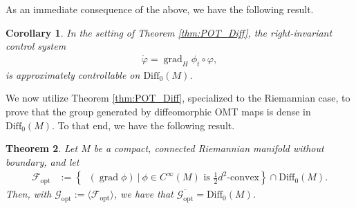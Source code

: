 \documentclass{article}
\newtheorem{theorem}{Theorem}
\newtheorem{corollary}[theorem]{Corollary}
\theoremstyle{remark}
\newcommand{\M}{M}
\newcommand{\Cinf}{C^{\infty}(\M)}
\newcommand{\cconv}{$\tfrac{1}{2}d^2$-convex}
\newcommand{\Diff}{\mathrm{Diff}_0(\M)}
\DeclareMathOperator{\grad}{\mathrm{grad}}
\DeclareMathOperator{\expg}{\mathrm{exp}^{\text{$g$}}}
\newcommand{\GOPT}{\mathcal{G}_{\mathrm{opt}}}
\newcommand{\FOPT}{\mathcal{F}_{\mathrm{opt}}}
\begin{document}
%
As an immediate consequence of the above, we have the following result.
%
\begin{corollary}
    In the setting of Theorem \ref{thm:POT_Diff}, the right-invariant control system 
    \begin{align*}
        \dot{\varphi} = \grad_H\phi_t\circ\varphi,
    \end{align*}
    is approximately controllable on $\Diff$.
\end{corollary}
%

We now utilize Theorem \ref{thm:POT_Diff}, specialized to the Riemannian case, to prove that the group generated by diffeomorphic OMT maps is dense in $\Diff$. To that end, we have the following result. 
%
\begin{theorem}\label{thm:POT_OPT}
    Let $\M$ be a compact, connected Riemannian manifold without boundary, and let
    \begin{align*}
        \FOPT&:=\left\{\expg(\grad\phi) ~|~\phi\in\Cinf\text{ is \cconv{}}\right\}\cap\Diff.
    \end{align*}
    Then, with $\GOPT:=\langle\FOPT\rangle$, we have that $\overline{\GOPT} = \Diff$.
\end{theorem}
%
\end{document}
